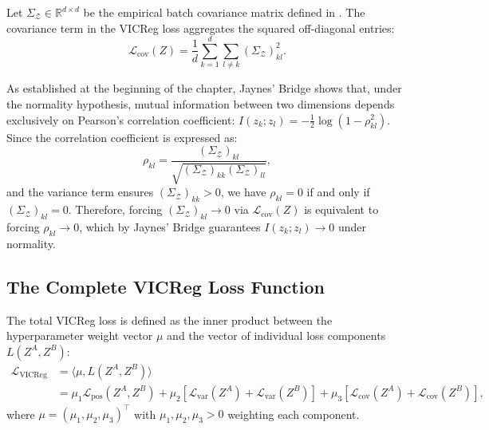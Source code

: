 \documentclass[11pt, oneside, openany]{book}
\begin{document}
\begin{definition}
\label{def:5.6}
Let $\Sigma_{\mathcal{Z}} \in \mathbb{R}^{d \times d}$ be the empirical batch covariance matrix defined in . The covariance term in the VICReg loss aggregates the squared off-diagonal entries:
\begin{equation}
\label{eq:5.26}
\mathcal{L}_{\text{cov}}(Z) = \frac{1}{d}\sum_{k=1}^{d} \sum_{l \neq k} (\Sigma_{\mathcal{Z}})_{kl}^{2}.
\end{equation}
\end{definition}

\begin{remark}
\label{rem:5.1}
As established at the beginning of the chapter, Jaynes' Bridge shows that, under the normality hypothesis, mutual information between two dimensions depends exclusively on Pearson's correlation coefficient: $I(z_{k}; z_{l}) = -\frac{1}{2}\log(1 - \rho_{kl}^{2})$. Since the correlation coefficient is expressed as:
\begin{equation}
\label{eq:5.27}
\rho_{kl} = \frac{(\Sigma_{\mathcal{Z}})_{kl}}{\sqrt{(\Sigma_{\mathcal{Z}})_{kk}(\Sigma_{\mathcal{Z}})_{ll}}},
\end{equation}
and the variance term ensures $(\Sigma_{\mathcal{Z}})_{kk} > 0$, we have $\rho_{kl} = 0$ if and only if $(\Sigma_{\mathcal{Z}})_{kl} = 0$. Therefore, forcing $(\Sigma_{\mathcal{Z}})_{kl} \to 0$ via $\mathcal{L}_{\text{cov}}(Z)$ is equivalent to forcing $\rho_{kl} \to 0$, which by Jaynes' Bridge guarantees $I(z_{k}; z_{l}) \to 0$ under normality.
\end{remark}

\subsection{The Complete VICReg Loss Function}
\label{sec:5.3.5}

\begin{definition}
\label{def:5.7}
The total VICReg loss is defined as the inner product between the hyperparameter weight vector $\mu$ and the vector of individual loss components $L(Z^{A}, Z^{B})$:
\begin{align}
\mathcal{L}_{\text{VICReg}} &= \langle \mu, L(Z^{A}, Z^{B}) \rangle \nonumber \\
&= \mu_{1}\mathcal{L}_{\text{pos}}(Z^{A}, Z^{B}) + \mu_{2}\left[\mathcal{L}_{\text{var}}(Z^{A}) + \mathcal{L}_{\text{var}}(Z^{B})\right] + \mu_{3}\left[\mathcal{L}_{\text{cov}}(Z^{A}) + \mathcal{L}_{\text{cov}}(Z^{B})\right], \label{eq:5.28}
\end{align}
where $\mu = (\mu_{1}, \mu_{2}, \mu_{3})^{\top}$ with $\mu_{1}, \mu_{2}, \mu_{3} > 0$ weighting each component.
\end{definition}
\end{document}
